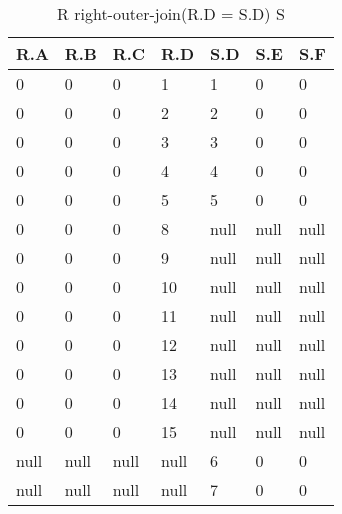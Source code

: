 \documentclass[12pt]{article}
\begin{document}
\begin{enumerate}
\begin{table}[]
	\caption{R right-outer-join(R.D = S.D) S}
	\centering
	\begin{tabular}{|l|l|l|l|l|l|l|}
	\hline
	\textbf{R.A} & \textbf{R.B} & \textbf{R.C} & \textbf{R.D} & \textbf{S.D} & \textbf{S.E} & \textbf{S.F} \\ \hline
	0            & 0            & 0            & 1            & 1            & 0            & 0            \\ \hline
	0            & 0            & 0            & 2            & 2            & 0            & 0            \\ \hline
	0            & 0            & 0            & 3            & 3            & 0            & 0            \\ \hline
	0            & 0            & 0            & 4            & 4            & 0            & 0            \\ \hline
	0            & 0            & 0            & 5            & 5            & 0            & 0            \\ \hline
	0            & 0            & 0            & 8            & null         & null         & null         \\ \hline
	0            & 0            & 0            & 9            & null         & null         & null         \\ \hline
	0            & 0            & 0            & 10           & null         & null         & null         \\ \hline
	0            & 0            & 0            & 11           & null         & null         & null         \\ \hline
	0            & 0            & 0            & 12           & null         & null         & null         \\ \hline
	0            & 0            & 0            & 13           & null         & null         & null         \\ \hline
	0            & 0            & 0            & 14           & null         & null         & null         \\ \hline
	0            & 0            & 0            & 15           & null         & null         & null         \\ \hline
	null         & null         & null         & null         & 6            & 0            & 0            \\ \hline
	null         & null         & null         & null         & 7            & 0            & 0            \\ \hline
	\end{tabular}
	\end{table}



\end{enumerate}
\end{document}
